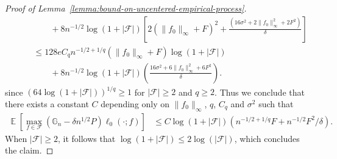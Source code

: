 \documentclass[12pt]{article}
\DeclareMathOperator*{\E}{\mathbb{E}}
\begin{document}
\begin{appendices}
\begin{proof}[Proof of Lemma~\ref{lemma:bound-on-uncentered-empirical-process}]
\begin{align}
&\qquad \qquad+ 8n^{-1/2}\log (1+|\mathcal{F}|)\left[2(\|f_0\|_\infty + F)^2+\frac{(16\sigma^2+2\|f_0\|_\infty^2 + 2F^2)}{\delta}\right]\nonumber\\
  &\qquad\le 128e C_q  n^{-1/2 + 1/q}(\|f_0\|_\infty + F)\log (1+|\mathcal{F}|)\nonumber \\
&\qquad \qquad+ 8n^{-1/2}\log (1+|\mathcal{F}|)\left(\frac{16\sigma^2+6\|f_0\|_\infty^2 + 6F^2}{\delta}\right).\nonumber
\end{align}
since $(64 \log (1+|\mathcal{F}|))^{1/q} \ge 1$ for $|\mathcal{F}| \ge 2$ and $q \ge 2$. Thus we conclude that there exists a constant $C$ depending only on $\|f_0\|_\infty$, $q$, $C_q$ and $\sigma^2$ such that 
\begin{align}
	\E\left[\max_{f \in \mathcal{F}}\left(\mathbb{G}_n -\delta n^{1/2}P\right)\ell_0(\cdot; f)\right]&\le C\log (1+|\mathcal{F}|)\left(n^{-1/2+1/q}F + n^{-1/2}F^2/\delta\right). \nonumber \end{align}
When $|\mathcal{F}| \ge 2$, it follows that $\log (1+|\mathcal{F}|) \le 2\log (|\mathcal{F}|)$, which concludes the claim.
 

\end{proof}
\end{appendices}
\end{document}
